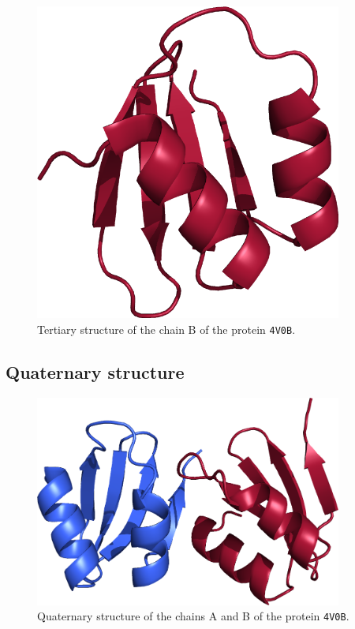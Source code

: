 \begin{figure}[htb]
\centering
\includegraphics[width=0.9\textwidth]{bioinfo/figures/tertiary}
\caption{Tertiary structure of the chain B of the protein \texttt{4V0B}.}\label{fig:tertiary}
\end{figure}

\subsection{Quaternary structure}

\begin{figure}[htb]
\centering
\includegraphics[width=0.9\textwidth]{bioinfo/figures/quaternary}
\caption{Quaternary structure of the chains A and B of the protein \texttt{4V0B}.}\label{fig:quaternary}
\end{figure}

